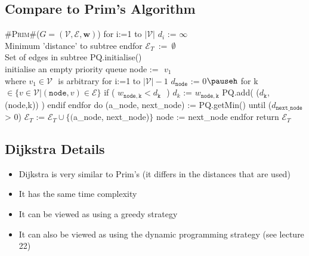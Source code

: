 \begin{slide}
\section[-2.4]{Compare to Prim's Algorithm}

\begin{pseudo}
#\textsc{Prim}#($G=(\mathcal{V},\mathcal{E},\bm{w})$) {
   for i:=1 to $|\mathcal{V}|$
      $d_i$ := $\infty$               \\ Minimum 'distance' to subtree
   endfor
   $\mathcal{E}_T\,$ := $\,\emptyset$                  \\ Set of edges in subtree
   PQ.initialise()       \\ initialise an empty priority queue
   node := $\,\,v_1$              \\ where $v_1\in\mathcal{V}\,\,$ is arbitrary
   for i:=1 to $|\mathcal{V}|-1$
      $d_{\mathtt{node}}$ := 0$\pauseh$
      for k $\in \{v\in\mathcal{V}| (\mathtt{node},v)\in\mathcal{E}\}$
         if ( $w_{\mathtt{node,k}} < d_{\mathtt{k}}\,\,$  )
            $d_{k}$ := $w_{\mathtt{node,k}}$
            PQ.add( ($d_{\mathtt{k}}$, (node,k)) )
         endif
      endfor
      do
         (a_node, next_node) := PQ.getMin()
      until ($d_{\mathtt{next\_node}}$  > 0)
      $\mathcal{E}_T$ := $\mathcal{E}_T \cup \{($a_node, next_node)$\}$
      node := next_node
   endfor
   return $\mathcal{E}_T$
}
\end{pseudo}
\vspace*{-1cm}
\end{slide}


\begin{slide}
\section{Dijkstra Details}

\begin{PauseHighLight}
  \begin{itemize}
  \item Dijkstra is very similar to Prim's (it differs in the distances
    that are used)\pause
  \item It has the same time complexity\pause
  \item It can be viewed as using a greedy strategy\pause
  \item It can also be viewed as using the dynamic programming strategy
    (see lecture 22)\pause
  \end{itemize}
\end{PauseHighLight}

\end{slide}

